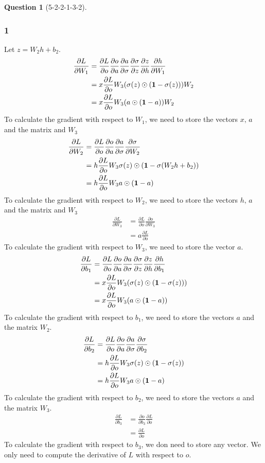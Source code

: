 \documentclass[12pt]{article}
\theoremstyle{definition}
\newtheorem{exercise}{Question}%
\newcommand{\pder}[2]{\frac{\partial #1}{\partial #2}}
\begin{document}
\begin{exercise}[5-2-2-1-3-2]
{\subsubsection*{1}
Let $z=W_{2}h+b_{2}$.
  \begin{align*}
    \pder{L}{W_1} &= \pder{L}{o} \pder{o}{a} \pder{a}{\sigma} \pder{\sigma}{z}\pder{z}{h}\pder{h}{W_{1}}\\
    &=x\pder{L}{o} W_{3} (\sigma(z)\odot(\bold{1}-\sigma(z)))W_{2}\\
    &= x\pder{L}{o} W_{3} (a \odot (\bold{1}-a)) W_{2}
  \end{align*}
  To calculate the gradient with respect to $W_{1}$, we need to store the
  vectors $x,\, a $ and the matrix and $W_{3}$
  \begin{align*}
    \pder{L}{W_2} &= \pder{L}{o}\pder{o}{a} \pder{a}{\sigma} \pder{\sigma}{W_{2}} \\
    &= h\pder{L}{o}  W_{3} \sigma(z)\odot(\bold{1}-\sigma(W_{2}h+b_{2}))\\
    &= h\pder{L}{o} W_{3} a\odot(\bold{1}-a)
  \end{align*}
  To calculate the gradient with respect to $W_{2}$, we need to store the
  vectors $ h,\, a $ and the matrix and $W_{3}$
  \begin{align*}
    \pder{L}{W_3} &= \pder{L}{o}\pder{o}{W_{3}} \\
    &= a\pder{L}{o}
  \end{align*}
  To calculate the gradient with respect to $W_{3}$, we need to store the
  vector $a$.
  \begin{align*}
    \pder{L}{b_1} &= \pder{L}{o} \pder{o}{a} \pder{a}{\sigma} \pder{\sigma}{z}\pder{z}{h}\pder{h}{b_{1}}\\
    &=x\pder{L}{o} W_{3} (\sigma(z)\odot(\bold{1}-\sigma(z)))\\
    &= x\pder{L}{o} W_{3} (a \odot (\bold{1}-a))\\
  \end{align*}
  To calculate the gradient with respect to $b_{1}$, we need to store the
  vectors $ a $ and the matrix $W_{2}$.
  \begin{align*}
    \pder{L}{b_2} &= \pder{L}{o}\pder{o}{a} \pder{a}{\sigma} \pder{\sigma}{b_{2}} \\
    &= h\pder{L}{o}  W_{3} \sigma(z)\odot(\bold{1}-\sigma(z))\\
    &= h\pder{L}{o} W_{3} a \odot (\bold{1}-a)
  \end{align*}
  To calculate the gradient with respect to $b_{2}$, we need to store the
  vectors $ a $ and the matrix $W_{3}$.
  \begin{align*}
    \pder{L}{b_{3}} &= \pder{o}{b_{3}} \pder{L}{o}\\
    &= \pder{L}{o}
  \end{align*}
  To calculate the gradient with respect to $b_{3}$, we don need to store any
  vector. We only need to compute the derivative of $L$ with respect to $o$.
}
\end{exercise}
\end{document}
